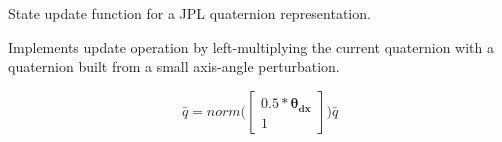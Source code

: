 State update function for a J\+PL quaternion representation. 

Implements update operation by left-\/multiplying the current quaternion with a quaternion built from a small axis-\/angle perturbation.

\[ \bar{q}=norm\Big(\begin{bmatrix} 0.5*\mathbf{\theta_{dx}} \\ 1 \end{bmatrix}\Big) \hat{\bar{q}} \] 